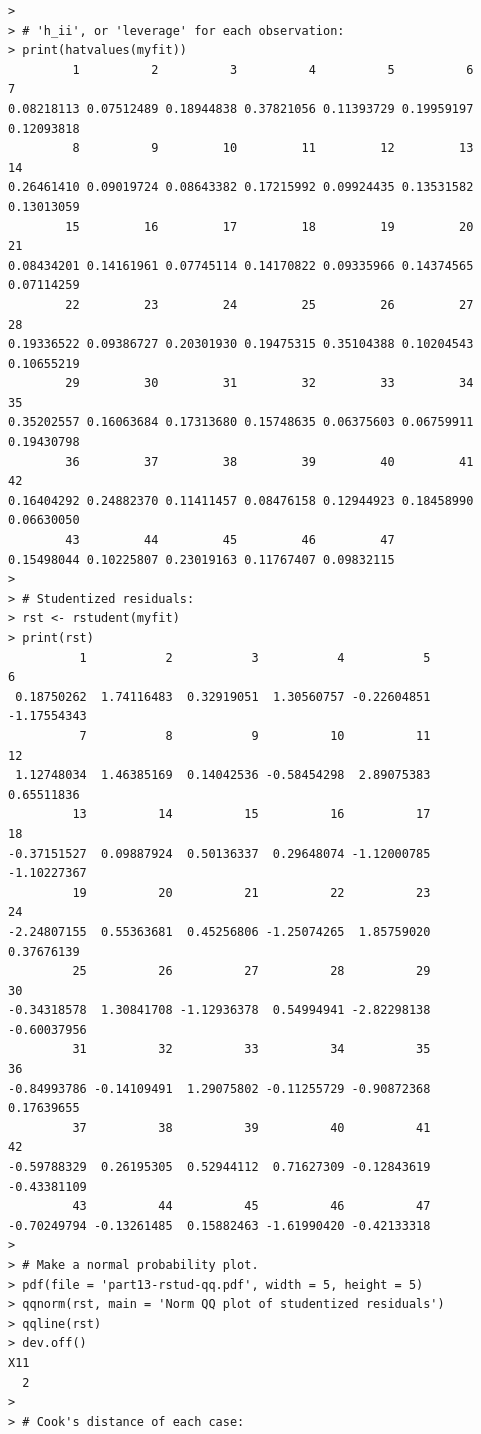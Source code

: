 \documentclass[12pt]{article}
\begin{document}
\begin{verbatim}
> 
> # 'h_ii', or 'leverage' for each observation:
> print(hatvalues(myfit))
         1          2          3          4          5          6          7 
0.08218113 0.07512489 0.18944838 0.37821056 0.11393729 0.19959197 0.12093818 
         8          9         10         11         12         13         14 
0.26461410 0.09019724 0.08643382 0.17215992 0.09924435 0.13531582 0.13013059 
        15         16         17         18         19         20         21 
0.08434201 0.14161961 0.07745114 0.14170822 0.09335966 0.14374565 0.07114259 
        22         23         24         25         26         27         28 
0.19336522 0.09386727 0.20301930 0.19475315 0.35104388 0.10204543 0.10655219 
        29         30         31         32         33         34         35 
0.35202557 0.16063684 0.17313680 0.15748635 0.06375603 0.06759911 0.19430798 
        36         37         38         39         40         41         42 
0.16404292 0.24882370 0.11411457 0.08476158 0.12944923 0.18458990 0.06630050 
        43         44         45         46         47 
0.15498044 0.10225807 0.23019163 0.11767407 0.09832115 
> 
> # Studentized residuals:
> rst <- rstudent(myfit)
> print(rst)
          1           2           3           4           5           6 
 0.18750262  1.74116483  0.32919051  1.30560757 -0.22604851 -1.17554343 
          7           8           9          10          11          12 
 1.12748034  1.46385169  0.14042536 -0.58454298  2.89075383  0.65511836 
         13          14          15          16          17          18 
-0.37151527  0.09887924  0.50136337  0.29648074 -1.12000785 -1.10227367 
         19          20          21          22          23          24 
-2.24807155  0.55363681  0.45256806 -1.25074265  1.85759020  0.37676139 
         25          26          27          28          29          30 
-0.34318578  1.30841708 -1.12936378  0.54994941 -2.82298138 -0.60037956 
         31          32          33          34          35          36 
-0.84993786 -0.14109491  1.29075802 -0.11255729 -0.90872368  0.17639655 
         37          38          39          40          41          42 
-0.59788329  0.26195305  0.52944112  0.71627309 -0.12843619 -0.43381109 
         43          44          45          46          47 
-0.70249794 -0.13261485  0.15882463 -1.61990420 -0.42133318 
> 
> # Make a normal probability plot.
> pdf(file = 'part13-rstud-qq.pdf', width = 5, height = 5)
> qqnorm(rst, main = 'Norm QQ plot of studentized residuals')
> qqline(rst)
> dev.off()
X11 
  2 
> 
> # Cook's distance of each case:

\end{verbatim}
\end{document}

